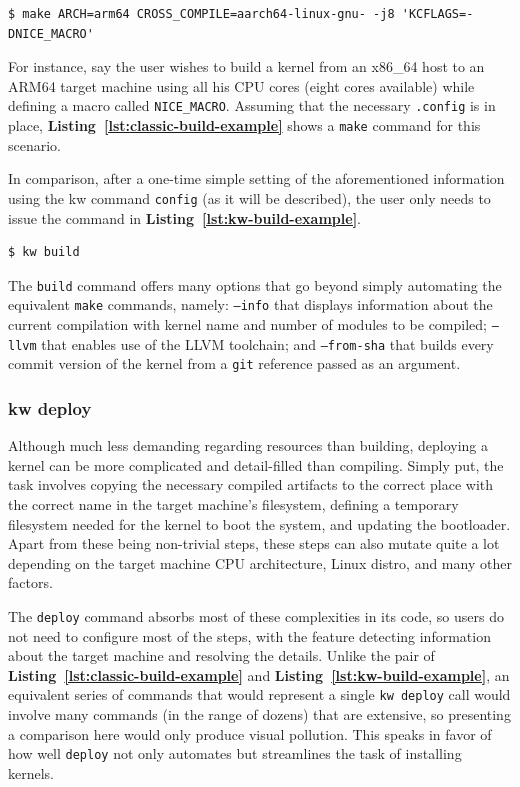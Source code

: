 \begin{lstlisting}[caption={Example of kernel build \texttt{make} command.}, label={lst:classic-build-example}]
$ make ARCH=arm64 CROSS_COMPILE=aarch64-linux-gnu- -j8 'KCFLAGS=-DNICE_MACRO'
\end{lstlisting}

For instance, say the user wishes to build a kernel from an x86\_64 host to an
ARM64 target machine using all his CPU cores (eight cores available) while
defining a macro called \texttt{NICE\_MACRO}. Assuming that the necessary
\texttt{.config} is in place, \textbf{Listing~\ref{lst:classic-build-example}}
shows a \texttt{make} command for this scenario. 


In comparison, after a one-time simple setting of the aforementioned information
using the kw command \texttt{config} (as it will be described), the user only
needs to issue the command in \textbf{Listing~\ref{lst:kw-build-example}}.

\begin{lstlisting}[caption={\texttt{kw build} use case.}, label={lst:kw-build-example}]
$ kw build
\end{lstlisting}

The \texttt{build} command offers many options that go beyond simply automating
the equivalent \texttt{make} commands, namely: \texttt{--info} that displays
information about the current compilation with kernel name and number of modules
to be compiled; \texttt{--llvm} that enables use of the LLVM toolchain; and
\texttt{--from-sha} that builds every commit version of the kernel from a
\texttt{git} reference passed as an argument.

\subsubsection{kw deploy}

Although much less demanding regarding resources than building, deploying a
kernel can be more complicated and detail-filled than compiling. Simply put, the
task involves copying the necessary compiled artifacts to the correct place with
the correct name in the target machine's filesystem, defining a temporary
filesystem needed for the kernel to boot the system, and updating the
bootloader. Apart from these being non-trivial steps, these steps can also
mutate quite a lot depending on the target machine CPU architecture, Linux
distro, and many other factors.

The \texttt{deploy} command absorbs most of these complexities in its code, so
users do not need to configure most of the steps, with the feature detecting
information about the target machine and resolving the details. Unlike the pair
of \textbf{Listing~\ref{lst:classic-build-example}} and
\textbf{Listing~\ref{lst:kw-build-example}}, an equivalent series of commands
that would represent a single \texttt{kw deploy} call would involve many
commands (in the range of dozens) that are extensive, so presenting a comparison
here would only produce visual pollution. This speaks in favor of how well
\texttt{deploy} not only automates but streamlines the task of installing
kernels.

